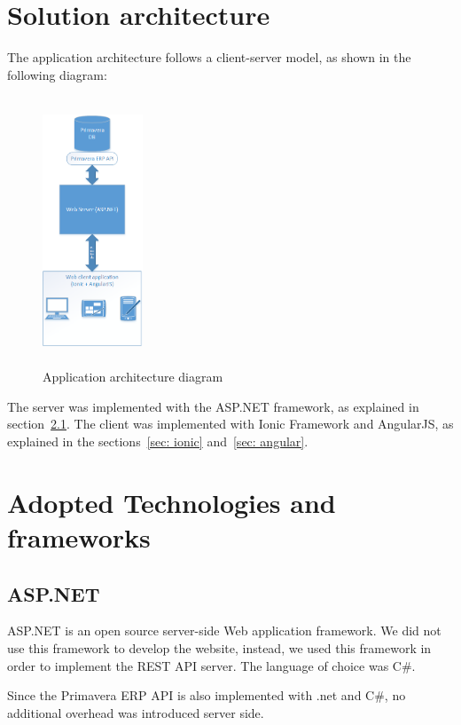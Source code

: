 \documentclass[a4paper]{article}
\begin{document}
\newpage

\section{Solution architecture}

The application architecture follows a client-server model, as shown in the following diagram:

\begin{figure}[h!]
\centerline{\includegraphics[height=8cm, width=3cm]{sinf_architecture_diagram.png}}
\caption{Application architecture diagram}
\end{figure}

The server was implemented with the ASP.NET framework, as explained in section~\ref{sec: aspnet}. The client was implemented with Ionic Framework and AngularJS, as explained in the sections~\ref{sec: ionic} and~\ref{sec: angular}.

\newpage

\section{Adopted Technologies and frameworks}

\subsection{ASP.NET}
\label{sec: aspnet}
ASP.NET is an open source server-side Web application framework. We did not use this framework to develop the website, instead, we used this framework in order to implement the REST API server. The language of choice was C\#.

Since the Primavera ERP API is also implemented with .net and C\#, no additional overhead was introduced server side.
\end{document}

